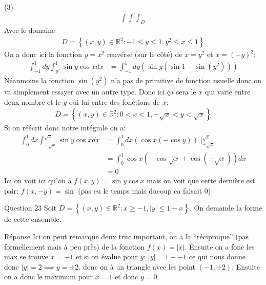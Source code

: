 \begin{parag}{(3)}
    \begin{align*} \int\int\int_D \end{align*}
    Avec le domaine 
    \begin{align*} 
        D =  \left\{\left(x, y\right)\in \mathbb{R}^{2}: -1 \leq y \leq 1, y^2 \leq x \leq 1\right\}
    \end{align*}
    On a donc ici la fonction $y =  x^2$ renvérsé (sur le côté) de $x =  y^2$ et $x =  \left(-y\right)^2$:
    \begin{align*} 
        \int_{-1}^1 dy \int_{y^2}^1 \sin y \cos x dx &=\int_{-1}^1dy\left(\sin y\left( \sin 1 - \sin\left(y^2\right)\right)\right)
    \end{align*}
    Néanmoins la fonction $\sin\left(y^2\right)$ n'a pas de primitive de fonction usuelle donc on va simplement essayer avec un autre type. Donc ici ça sera le $x$ qui varie entre deux nombre et le $y$ qui lui entre des fonctions de $x$:
    \begin{align*} 
        D =  \left\{\left(x, y \right) \in \mathbb{R}^{2}: 0 < x < 1, -\sqrt{x} < y <\sqrt{x}\right\}
    \end{align*}
    Si on réécrit donc notre intégrale on a:
    \begin{align*} 
        \int_0^1 dx \int_{-\sqrt{x}}^{\sqrt{x}}\sin y \cos x dx &= \int_0^1dx \left(\cos x \left(-\cos y\right)\right)\mid_{-\sqrt{x}}^{\sqrt{x}}\\
                                                                &= \int_0^1 \cos x \left(-\cos \sqrt{x} + \cos \left(-\sqrt{x}\right)\right)dx\\
                                                                &= 0
    \end{align*}
    Ici on voit ici qu'on a $f\left(x, y\right) =  \sin y \cos x$ mais on voit que cette dernière est pair: $f\left(x, -y\right) = \sin$ (pas eu le temps mais ducoup ca faisait 0)
\end{parag}
\begin{parag}{Question 23}
    Soit $D =  \left\{\left(x, y\right)\in \mathbb{R}^{2}: x \geq -1, \left|y\right| \leq 1 - x\right\}$. On demande la forme de cette ensemble.\\
    \begin{subparag}{Réponse}
        Ici on peut remarque deux truc important, on a la ``réciproque'' (pas formellement mais à peu près) de la fonction $f\left(x\right) =  \left|x\right|$. Ensuite on a fonc les max se trouve $ x =  -1$ et si on évalue pour $y$: $\left|y\right| = 1 - - 1$ ce qui nous donne donc $\left|y\right|= 2 \implies  y =\pm 2$. donc on à un triangle avec les point $\left(-1, \pm 2\right)$. Ensuite on a donc le maximum pour $x =  1$ et donc $y =  0$. 
    \end{subparag}
\end{parag}

